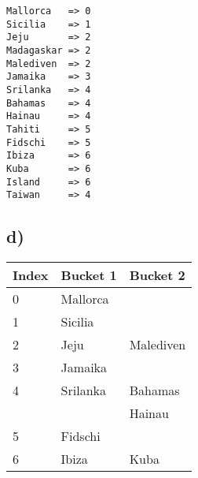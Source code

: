 \documentclass[a4paper]{article}
\begin{document}
\begin{verbatim}
Mallorca   => 0
Sicilia    => 1
Jeju       => 2
Madagaskar => 2
Malediven  => 2
Jamaika    => 3
Srilanka   => 4
Bahamas    => 4
Hainau     => 4
Tahiti     => 5
Fidschi    => 5
Ibiza      => 6
Kuba       => 6
Island     => 6
Taiwan     => 4
\end{verbatim}

\subsection*{d)}
\begin{tabular}[!h]{|l|l|l|}
	\hline
	Index & Bucket 1 & Bucket 2 \\
	\hline
	\hline
	0 & Mallorca   &            \\
	\hline
	1 & Sicilia    &            \\
	\hline
	2 & Jeju       & Malediven  \\
	\hline
	3 & Jamaika    &            \\
	\hline
	4 & Srilanka   & Bahamas    \\
	  &            & Hainau     \\
	\hline
	5 & Fidschi    &            \\
	\hline
	6 & Ibiza      & Kuba       \\
	\hline
\end{tabular}
\end{document}
